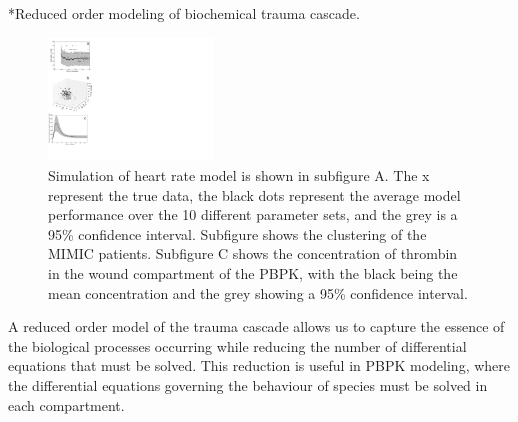 \documentclass[11pt]{article}
\makeatletter
\renewcommand\paragraph{\@startsection
  {paragraph}{2}{0mm}
  {-0.05in}
  {-0.5\baselineskip}
  {\normalfont\normalsize\itshape}}
\makeatother
\begin{document}
\paragraph*{Reduced order modeling of biochemical trauma cascade.}
\begin{figure}
  \includegraphics[width=0.39\textwidth,trim={0cm 2cm 20.2cm 0},clip]{./figures/colfigure.pdf}
  \caption{Simulation of heart rate model is shown in subfigure A. The x represent the true data, the black dots represent the average model performance over the 10 different parameter sets, and the grey is a 95\% confidence interval. Subfigure shows the clustering of the MIMIC patients. Subfigure C shows the concentration of thrombin in the wound compartment of the PBPK, with the black being the mean concentration and the grey showing a 95\% confidence interval.}\label{fig:mulitobjperformance}
\end{figure}
A reduced order model of the trauma cascade allows us to capture the essence of the biological processes occurring while reducing the number of differential equations that must be solved. This reduction is useful in PBPK modeling, where the differential equations governing the behaviour of species must be solved in each compartment. 
\end{document}
